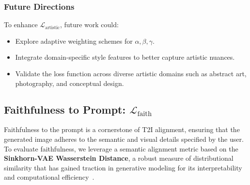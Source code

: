 \subsubsection{Future Directions}
To enhance \(\mathcal{L}_{\text{artistic}}\), future work could:
\begin{itemize}
    \item Explore adaptive weighting schemes for \(\alpha, \beta, \gamma\).
    \item Integrate domain-specific style features to better capture artistic nuances.
    \item Validate the loss function across diverse artistic domains such as abstract art, photography, and conceptual design.
\end{itemize}


\subsection{Faithfulness to Prompt: \(\mathcal{L}_{\text{faith}}\)}

Faithfulness to the prompt is a cornerstone of T2I alignment, ensuring that the generated image adheres to the semantic and visual details specified by the user. To evaluate faithfulness, we leverage a semantic alignment metric based on the \textbf{Sinkhorn-VAE Wasserstein Distance}, a robust measure of distributional similarity that has gained traction in generative modeling for its interpretability and computational efficiency~\cite{arjovsky2017wasserstein, tolstikhin2018wasserstein}.

